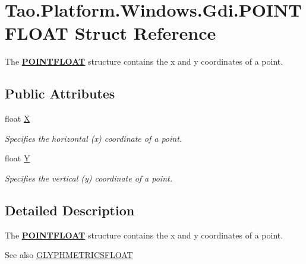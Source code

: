 \hypertarget{struct_tao_1_1_platform_1_1_windows_1_1_gdi_1_1_p_o_i_n_t_f_l_o_a_t}{
\section{Tao.Platform.Windows.Gdi.POINTFLOAT Struct Reference}
\label{struct_tao_1_1_platform_1_1_windows_1_1_gdi_1_1_p_o_i_n_t_f_l_o_a_t}
}


The {\bfseries \hyperlink{struct_tao_1_1_platform_1_1_windows_1_1_gdi_1_1_p_o_i_n_t_f_l_o_a_t}{POINTFLOAT}} structure contains the x and y coordinates of a point.  


\subsection*{Public Attributes}
\begin{DoxyCompactItemize}
\item 
float \hyperlink{struct_tao_1_1_platform_1_1_windows_1_1_gdi_1_1_p_o_i_n_t_f_l_o_a_t_ada8984b7759fcda00b76f906ef02665f}{X}
\begin{DoxyCompactList}\small\item\em Specifies the horizontal (x) coordinate of a point. \item\end{DoxyCompactList}\item 
float \hyperlink{struct_tao_1_1_platform_1_1_windows_1_1_gdi_1_1_p_o_i_n_t_f_l_o_a_t_afe74255efac2b639ae9c3b1b135cbabc}{Y}
\begin{DoxyCompactList}\small\item\em Specifies the vertical (y) coordinate of a point. \item\end{DoxyCompactList}\end{DoxyCompactItemize}


\subsection{Detailed Description}
The {\bfseries \hyperlink{struct_tao_1_1_platform_1_1_windows_1_1_gdi_1_1_p_o_i_n_t_f_l_o_a_t}{POINTFLOAT}} structure contains the x and y coordinates of a point. \begin{DoxySeeAlso}{See also}
\hyperlink{struct_tao_1_1_platform_1_1_windows_1_1_gdi_1_1_g_l_y_p_h_m_e_t_r_i_c_s_f_l_o_a_t}{GLYPHMETRICSFLOAT}


\end{DoxySeeAlso}


